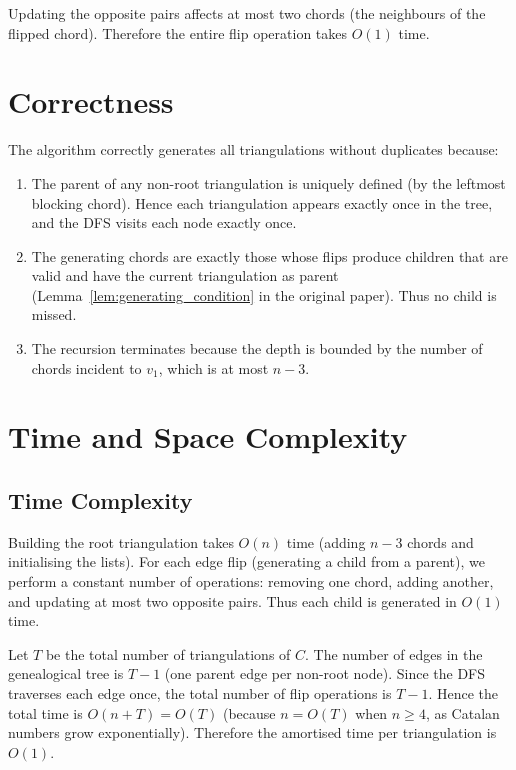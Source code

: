 \begin{remark}
    Updating the opposite pairs affects at most two chords (the neighbours of the flipped chord). 
    Therefore the entire flip operation takes \(O(1)\) time.
\end{remark}

\section{Correctness}
\label{sec:cycle_correctness}

The algorithm correctly generates all triangulations without duplicates because:

\begin{enumerate}
    \item The parent of any non-root triangulation is uniquely defined (by the leftmost blocking chord). 
    Hence each triangulation appears exactly once in the tree, and the DFS visits each node exactly once.
    \item The generating chords are exactly those whose flips produce children that are valid and have the current triangulation as parent (Lemma~\ref{lem:generating_condition} in the original paper). 
    Thus no child is missed.
    \item The recursion terminates because the depth is bounded by the number of chords incident to \(v_1\), which is at most \(n-3\).
\end{enumerate}

\section{Time and Space Complexity}
\label{sec:cycle_complexity}

\subsection{Time Complexity}

Building the root triangulation takes \(O(n)\) time (adding \(n-3\) chords and initialising the lists). 
For each edge flip (generating a child from a parent), we perform a constant number of operations: 
removing one chord, adding another, and updating at most two opposite pairs. 
Thus each child is generated in \(O(1)\) time.

Let \(T\) be the total number of triangulations of \(C\). 
The number of edges in the genealogical tree is \(T - 1\) (one parent edge per non-root node). 
Since the DFS traverses each edge once, the total number of flip operations is \(T - 1\). 
Hence the total time is \(O(n + T) = O(T)\) (because \(n = O(T)\) when \(n \ge 4\), as Catalan numbers grow exponentially). 
Therefore the amortised time per triangulation is \(O(1)\).

